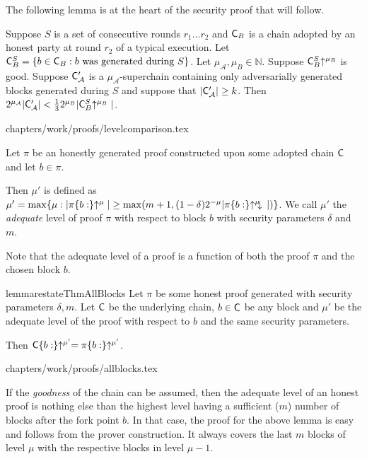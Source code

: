 The following lemma is at the heart of the security proof that will follow.

\begin{lemma}\label{lem.level-comparison}
    Suppose $S$ is a set of consecutive rounds $r_1 \ldots r_2$
    and $\mathsf{C}_B$ is
    a chain adopted by an honest party at round $r_2$ of a typical execution.
    Let $\mathsf{C}_B^S = \{b \in
    \mathsf{C}_B: b \textnormal{ was generated during } S\}$. Let $\mu_\mathcal{A},
    \mu_B \in \mathbb{N}$. Suppose $\mathsf{C}_B^S\negthickspace\uparrow^{\mu_B}$ is good.
    Suppose $\mathsf{C}'_\mathcal{A}$ is a $\mu_\mathcal{A}$-superchain containing
    only adversarially generated blocks generated during $S$ and suppose that
    $|\mathsf{C}'_\mathcal{A}| \geq k$.
    Then
    $2^{\mu_\mathcal{A}}|\mathsf{C}'_\mathcal{A}| < \frac{1}{3}2^{\mu_B}|\mathsf{C}_B^S\negthickspace\uparrow^{\mu_B}|$.
\end{lemma}
{chapters/work/proofs/levelcomparison.tex}

\begin{definition}
Let $\pi$ be an honestly generated proof constructed upon some adopted chain
$\mathsf{C}$ and let $b \in \pi$.

Then $\mu'$ is defined as  $\mu' = \max\{\mu: |\pi\{b:\}\negthickspace\uparrow^\mu| \geq
\max(m + 1, (1 - \delta)2^{-\mu}|\pi\{b:\}\negthickspace\uparrow^\mu\negthickspace\downarrow\,|)\}$.
We call $\mu'$ the \emph{adequate} level of proof $\pi$ with respect to
block $b$ with security parameters $\delta$ and $m$.
\end{definition}

Note that the adequate level of a proof is a function of both the proof $\pi$
and the chosen block $b$.

\begin{restatable}{lemma}{restateThmAllBlocks}\label{lem.allblocks}
Let $\pi$ be some honest proof generated with security parameters $\delta, m$.
Let $\mathsf{C}$ be the underlying chain, $b \in \mathsf{C}$ be any block and $\mu'$ be
the adequate level of the proof with respect to $b$ and the same security
parameters.

Then $\mathsf{C}\{b:\}\negthickspace\uparrow^{\mu'} = \pi\{b:\}\negthickspace\uparrow^{\mu'}$.
\end{restatable}
{chapters/work/proofs/allblocks.tex}

\begin{remark}
  If the \emph{goodness} of the chain can be assumed, then the adequate level of
  an honest proof is nothing else than the highest level having a sufficient
  ($m$) number of blocks after the fork point $b$. In that case, the proof for
  the above lemma is easy and follows from the prover construction. It always
  covers the last $m$ blocks of level $\mu$ with the respective blocks in
  level $\mu - 1$.
\end{remark}

